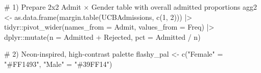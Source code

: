 \documentclass[
  letterpaper,
  DIV=11,
  numbers=noendperiod]{scrreprt}
\newenvironment{Shaded}{\begin{snugshade}}{\end{snugshade}}
\newcommand{\AttributeTok}[1]{\textcolor[rgb]{0.40,0.45,0.13}{#1}}
\newcommand{\CommentTok}[1]{\textcolor[rgb]{0.37,0.37,0.37}{#1}}
\newcommand{\DecValTok}[1]{\textcolor[rgb]{0.68,0.00,0.00}{#1}}
\newcommand{\FunctionTok}[1]{\textcolor[rgb]{0.28,0.35,0.67}{#1}}
\newcommand{\NormalTok}[1]{\textcolor[rgb]{0.00,0.23,0.31}{#1}}
\newcommand{\OtherTok}[1]{\textcolor[rgb]{0.00,0.23,0.31}{#1}}
\newcommand{\SpecialCharTok}[1]{\textcolor[rgb]{0.37,0.37,0.37}{#1}}
\newcommand{\StringTok}[1]{\textcolor[rgb]{0.13,0.47,0.30}{#1}}
\begin{document}
\begin{Shaded}
\begin{Highlighting}[]
\CommentTok{\# 1) Prepare 2x2 Admit × Gender table with overall admitted proportions}
\NormalTok{agg2 }\OtherTok{\textless{}{-}} \FunctionTok{as.data.frame}\NormalTok{(}\FunctionTok{margin.table}\NormalTok{(UCBAdmissions, }\FunctionTok{c}\NormalTok{(}\DecValTok{1}\NormalTok{, }\DecValTok{2}\NormalTok{))) }\SpecialCharTok{|\textgreater{}}
\NormalTok{  tidyr}\SpecialCharTok{::}\FunctionTok{pivot\_wider}\NormalTok{(}\AttributeTok{names\_from =}\NormalTok{ Admit, }\AttributeTok{values\_from =}\NormalTok{ Freq) }\SpecialCharTok{|\textgreater{}}
\NormalTok{  dplyr}\SpecialCharTok{::}\FunctionTok{mutate}\NormalTok{(}\AttributeTok{n =}\NormalTok{ Admitted }\SpecialCharTok{+}\NormalTok{ Rejected,}
                \AttributeTok{pct =}\NormalTok{ Admitted }\SpecialCharTok{/}\NormalTok{ n)}

\CommentTok{\# 2) Neon{-}inspired, high{-}contrast palette}
\NormalTok{flashy\_pal }\OtherTok{\textless{}{-}} \FunctionTok{c}\NormalTok{(}\StringTok{"Female"} \OtherTok{=} \StringTok{"\#FF1493"}\NormalTok{,   }
                \StringTok{"Male"}   \OtherTok{=} \StringTok{"\#39FF14"}\NormalTok{)  }


\end{Highlighting}
\end{Shaded}
\end{document}
